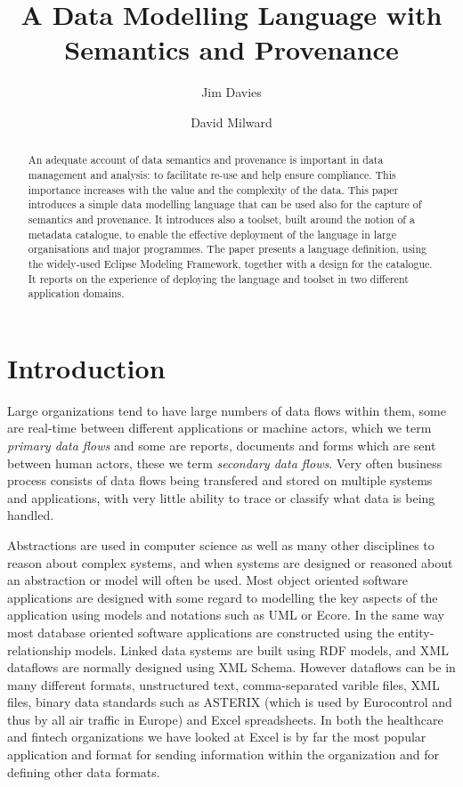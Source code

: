 \documentclass{llncs}
\begin{document}
%
\frontmatter          %
%
\pagestyle{headings}  %
\title{A Data Modelling Language with Semantics and Provenance}

\author{Jim Davies \and
	David Milward}

	

\maketitle

\begin{abstract}
An adequate account of data semantics and provenance is important in data management and analysis: to facilitate re-use and help ensure compliance.  This importance increases with the value and the complexity of the data.  This paper introduces a simple data modelling language that can be used also for the capture of semantics and provenance.  It introduces also a toolset, built around the notion of a metadata catalogue, to enable the effective deployment of the language in large organisations and major programmes.  The paper presents a language definition, using the widely-used Eclipse Modeling Framework, together with a design for the catalogue.  It reports on the experience of deploying the language and toolset in two different application domains.
\end{abstract}
%

%
\section{Introduction}

Large organizations tend to have large numbers of data flows within them, some are real-time between different applications or machine actors, which we term \emph{primary data flows} and some are reports, documents and forms which are sent between human actors, these we term \emph{secondary data flows}. Very often business process consists of data flows being transfered and stored on multiple systems and applications, with very little ability to trace or classify what data is being handled.

Abstractions are used in computer science as well as many other disciplines to reason about complex systems, and when systems are designed or reasoned about an abstraction or model will often be used.  Most object oriented software applications are designed with some regard to modelling the key aspects of the application using models and notations such as UML or Ecore.  In the same way most database oriented software applications are constructed using the entity-relationship models. Linked data systems are built using RDF models, and XML dataflows are normally designed using XML Schema. However dataflows can be in many different formats, unstructured text, comma-separated varible files, XML files, binary data standards such as ASTERIX (which is used by Eurocontrol and thus by all air traffic in Europe) and Excel spreadsheets. In both the healthcare and fintech organizations we have looked at Excel is by far the most popular application and format for sending information within the organization and for defining other data formats.
\end{document}
